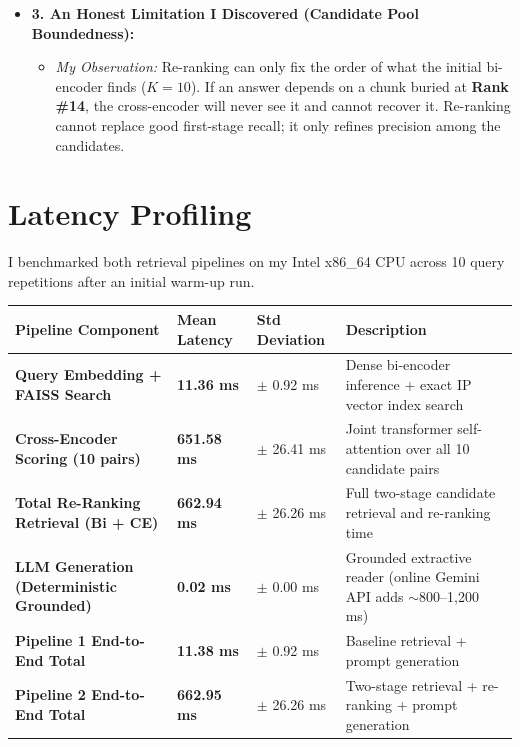 \documentclass[10pt,a4paper]{article}
\begin{document}
\begin{itemize}[leftmargin=1.4em, itemsep=2pt, topsep=1pt]
  \item \textbf{3. An Honest Limitation I Discovered (Candidate Pool Boundedness):}
  \begin{itemize}[leftmargin=1.2em, itemsep=1pt]
    \item \textit{My Observation:} Re-ranking can only fix the order of what the initial bi-encoder finds ($K = 10$). If an answer depends on a chunk buried at \textbf{Rank \#14}, the cross-encoder will never see it and cannot recover it. Re-ranking cannot replace good first-stage recall; it only refines precision among the candidates.
  \end{itemize}
\end{itemize}

\newpage


\section{Latency Profiling}

I benchmarked both retrieval pipelines on my Intel x86\_64 CPU across 10 query repetitions after an initial warm-up run.

\vspace{1pt}
\begin{table}[h!]
\centering
\small
\renewcommand{\arraystretch}{1.16}
\begin{tabularx}{\textwidth}{@{} L{6.2cm} C{2.2cm} C{2.2cm} Y @{}}
\hline
{}
\textbf{Pipeline Component} & \textbf{Mean Latency} & \textbf{Std Deviation} & \textbf{Description} \\
\hline
\textbf{Query Embedding + FAISS Search} & \textbf{11.36 ms} & $\pm$ 0.92 ms & Dense bi-encoder inference + exact IP vector index search \\
\textbf{Cross-Encoder Scoring (10 pairs)} & \textbf{651.58 ms} & $\pm$ 26.41 ms & Joint transformer self-attention over all 10 candidate pairs \\
\textbf{Total Re-Ranking Retrieval (Bi + CE)} & \textbf{662.94 ms} & $\pm$ 26.26 ms & Full two-stage candidate retrieval and re-ranking time \\
\textbf{LLM Generation (Deterministic Grounded)} & \textbf{0.02 ms} & $\pm$ 0.00 ms & Grounded extractive reader (online Gemini API adds $\sim$800--1,200 ms) \\
\textbf{Pipeline 1 End-to-End Total} & \textbf{11.38 ms} & $\pm$ 0.92 ms & Baseline retrieval + prompt generation \\
\textbf{Pipeline 2 End-to-End Total} & \textbf{662.95 ms} & $\pm$ 26.26 ms & Two-stage retrieval + re-ranking + prompt generation \\
\hline
\end{tabularx}
\end{table}
\end{document}
